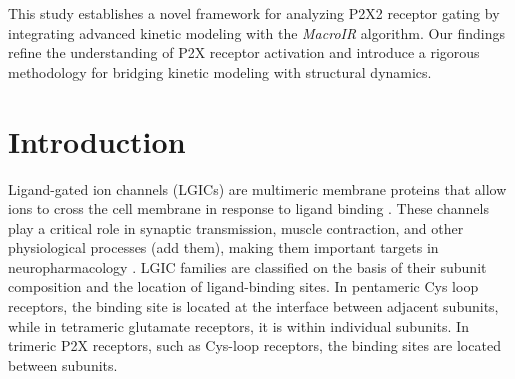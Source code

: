 \documentclass[pdflatex,sn-mathphys-num]{sn-jnl}%
\theoremstyle{thmstyleone}%
\theoremstyle{thmstyletwo}%
\theoremstyle{thmstylethree}%
\begin{document}
This study establishes a novel framework for analyzing P2X2 receptor gating by integrating advanced kinetic modeling with the \textit{MacroIR} algorithm. Our findings refine the understanding of P2X receptor activation and introduce a rigorous methodology for bridging kinetic modeling with structural dynamics.

\section{Introduction}
\label{sec1}

Ligand-gated ion channels (LGICs) are multimeric membrane proteins that allow ions to cross the cell membrane in response to ligand binding \cite{p2x_cuerpo_humano}. These channels play a critical role in synaptic transmission, muscle contraction, and other physiological processes (add them), making them important targets in neuropharmacology \cite{p2x_drugs,therapeutic,p2x7_pharmacology}. LGIC families are classified on the basis of their subunit composition and the location of ligand-binding sites. In pentameric Cys loop receptors, the binding site is located at the interface between adjacent subunits, while in tetrameric glutamate receptors, it is within individual subunits. In trimeric P2X receptors, such as Cys-loop receptors, the binding sites are located between subunits.

\end{document}
